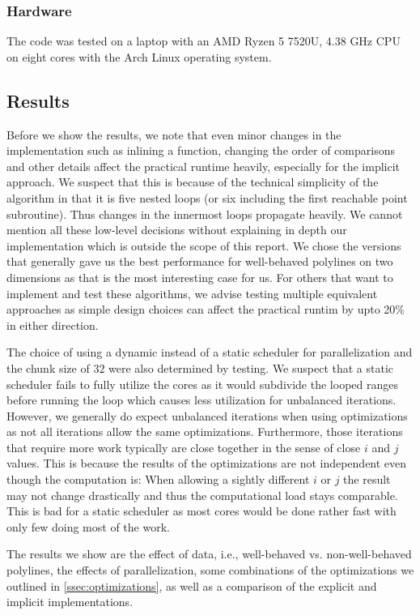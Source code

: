 \subsubsection{Hardware}
\label{subsubsec:hardware}
The code was tested on a laptop with an AMD Ryzen 5 7520U, 4.38 GHz CPU on eight cores with the Arch Linux operating system.


\subsection{Results}
\label{subsec:results}
Before we show the results, we note that even minor changes in the implementation such as inlining a function, changing the order of comparisons and other details affect the practical runtime heavily, especially for the implicit approach. We suspect that this is because of the technical simplicity of the algorithm in that it is five nested loops (or six including the first reachable point subroutine). Thus changes in the innermost loops propagate heavily. We cannot mention all these low-level decisions without explaining in depth our implementation which is outside the scope of this report. We chose the versions that generally gave us the best performance for well-behaved polylines on two dimensions as that is the most interesting case for us. For others that want to implement and test these algorithms, we advise testing multiple equivalent approaches as simple design choices can affect the practical runtim by upto 20\% in either direction. 

The choice of using a dynamic instead of a static scheduler for parallelization and the chunk size of \(32\) were also determined by testing. We suspect that a static scheduler fails to fully utilize the cores as it would subdivide the looped ranges before running the loop which causes less utilization for unbalanced iterations. However, we generally do expect unbalanced iterations when using optimizations as not all iterations allow the same optimizations. Furthermore, those iterations that require more work typically are close together in the sense of close \(i\) and \(j\) values. This is because the results of the optimizations are not independent even though the computation is: When allowing a sightly different \(i\) or \(j\) the result may not change drastically and thus the computational load stays comparable. This is bad for a static scheduler as most cores would be done rather fast with only few doing most of the work. 

The results we show are the effect of data, i.e., well-behaved vs. non-well-behaved polylines, the effects of parallelization, some combinations of the optimizations we outlined in \cref{ssec:optimizations}, as well as a comparison of the explicit and implicit implementations. 



